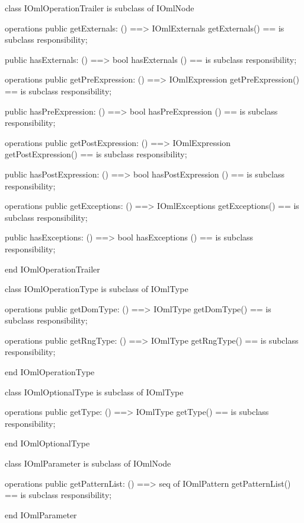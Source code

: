 \begin{vdm_al}
class IOmlOperationTrailer
 is subclass of IOmlNode

operations
  public getExternals: () ==> IOmlExternals
  getExternals() == is subclass responsibility;

  public hasExternals: () ==> bool
  hasExternals () == is subclass responsibility;

operations
  public getPreExpression: () ==> IOmlExpression
  getPreExpression() == is subclass responsibility;

  public hasPreExpression: () ==> bool
  hasPreExpression () == is subclass responsibility;

operations
  public getPostExpression: () ==> IOmlExpression
  getPostExpression() == is subclass responsibility;

  public hasPostExpression: () ==> bool
  hasPostExpression () == is subclass responsibility;

operations
  public getExceptions: () ==> IOmlExceptions
  getExceptions() == is subclass responsibility;

  public hasExceptions: () ==> bool
  hasExceptions () == is subclass responsibility;

end IOmlOperationTrailer
\end{vdm_al}

\begin{vdm_al}
class IOmlOperationType
 is subclass of IOmlType

operations
  public getDomType: () ==> IOmlType
  getDomType() == is subclass responsibility;

operations
  public getRngType: () ==> IOmlType
  getRngType() == is subclass responsibility;

end IOmlOperationType
\end{vdm_al}

\begin{vdm_al}
class IOmlOptionalType
 is subclass of IOmlType

operations
  public getType: () ==> IOmlType
  getType() == is subclass responsibility;

end IOmlOptionalType
\end{vdm_al}

\begin{vdm_al}
class IOmlParameter
 is subclass of IOmlNode

operations
  public getPatternList: () ==> seq of IOmlPattern
  getPatternList() == is subclass responsibility;

end IOmlParameter
\end{vdm_al}

